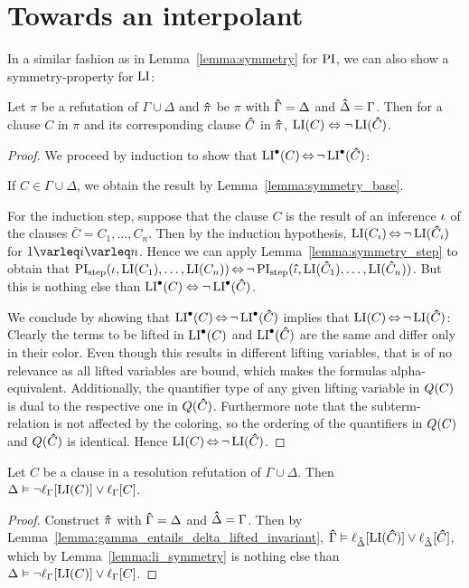 \section{Towards an interpolant}

In a similar fashion as in Lemma~\ref{lemma:symmetry} for $\operatorname{PI}$, we can also show a symmetry-property for $\operatorname{LI}$:

\begin{lemma}
	\label{lemma:li_symmetry}
	Let $\pi$ be a refutation of $\Gamma\cup\Delta$ and $\bm\hat \pi$ be $\pi$ with $\bm\hat \Gamma = \Delta$ and $\bm\hat \Delta = \Gamma$.
	Then for a clause $C$ in $\pi$ and its corresponding clause $\bm\hat C$ in $\bm\hat \pi$, $\operatorname{LI}(C) \;{\operatorname{\Leftrightarrow}}\; \lnot \operatorname{LI}(\bm\hat C)$.
\end{lemma}
\begin{proof}
	We proceed by induction to show that $\operatorname{LI}^\bullet(C) \operatorname{\Leftrightarrow} \lnot \operatorname{LI}^\bullet(\bm\hat C)$:

	If $C \in \Gamma\cup \Delta$, we obtain the result by Lemma~\ref{lemma:symmetry_base}.

	For the induction step, suppose that the clause $C$ is the result of an inference $\iota$ of the clauses $\bar C = C_1, \dots, C_n$.
	Then by the induction hypothesis, $\operatorname{LI}(C_i) \operatorname{\Leftrightarrow} \lnot \operatorname{LI}(\bm\hat{C}_i)$ for $1 \varleq i \varleq n$. 
	Hence we can apply Lemma~\ref{lemma:symmetry_step} to obtain that $\operatorname{PI}_{\mathrm{step}}(\iota, \operatorname{LI}(C_1), \dots, \operatorname{LI}(C_n)) \operatorname{\Leftrightarrow} \lnot \operatorname{PI}_{\mathrm{step}}(\bm\hat{\iota}, \operatorname{LI}(\bm\hat{C}_1), \dots, \operatorname{LI}(\bm\hat{C}_n))$.
	But this is nothing else than $\operatorname{LI}^\bullet(C) \;{\operatorname{\Leftrightarrow}}\; \lnot \operatorname{LI}^\bullet(\bm\hat{C})$.


	We conclude by showing that 
	$\operatorname{LI}^\bullet(C) \operatorname{\Leftrightarrow} \lnot \operatorname{LI}^\bullet(\bm\hat C)$ 
	implies that 
	$\operatorname{LI}(C) \operatorname{\Leftrightarrow} \lnot \operatorname{LI}(\bm\hat C)$:
	Clearly the terms to be lifted in $\operatorname{LI}^\bullet(C)$ and $\operatorname{LI}^\bullet(\bm\hat C)$ are the same and differ only in their color.
	Even though this results in different lifting variables, that is of no relevance as all lifted variables are bound, which makes the formulas alpha-equivalent.
	Additionally, the quantifier type of any given lifting variable in $Q(C)$ is dual to the respective one in $Q(\bm\hat C)$.
	Furthermore note that the subterm-relation is not affected by the coloring, so the ordering of the quantifiers in $Q(C)$ and $Q(\bm\hat C)$ is identical.
	Hence 
	$\operatorname{LI}(C) \operatorname{\Leftrightarrow} \lnot \operatorname{LI}(\bm\hat C)$.
\end{proof}


\begin{lemma}
	\label{lemma:delta_entails_li}
	Let $C$ be a clause in a resolution refutation of $\Gamma \cup \Delta$.
	Then
	$\Delta \vDash \lnot\ell_{\Gamma}[\operatorname{LI}(C)] \lor \ell_{\Gamma}[C]$.
\end{lemma}
\begin{proof}
	Construct $\bm\hat \pi$ with $\bm\hat \Gamma = \Delta$ and $\bm\hat \Delta = \Gamma$. 
	Then by Lemma~\ref{lemma:gamma_entails_delta_lifted_invariant}, $\bm\hat \Gamma \vDash \ell_{\bm\hat \Delta}[\operatorname{LI}(\bm\hat C)] \lor \ell_{\bm\hat \Delta}[\bm\hat C]$, 
	which by Lemma~\ref{lemma:li_symmetry} is nothing else than
	$\Delta \vDash \lnot \ell_{\Gamma}[\operatorname{LI}(C)] \lor \ell_{\Gamma}[C]$.
\end{proof}

